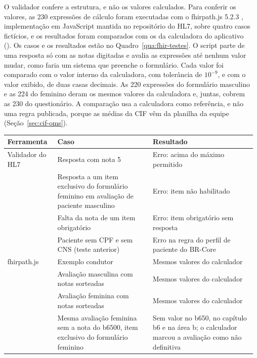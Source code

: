 O validador confere a estrutura, e não os valores calculados. Para conferir os valores, as 230 expressões de cálculo
foram executadas com o fhirpath.js 5.2.3 \cite{hl7fhirpathjs}, implementação em JavaScript mantida no repositório
do HL7, sobre quatro casos fictícios, e os resultados foram comparados com os da calculadora do aplicativo
(). Os casos e os resultados estão no
Quadro~\ref{qua:fhir-testes}. O script parte de uma resposta só com as notas digitadas e avalia as expressões até
nenhum valor mudar, como faria um sistema que preenche o formulário. Cada valor foi comparado com o valor interno da
calculadora, com tolerância de $10^{-9}$, e com o valor exibido, de duas casas decimais. As 220 expressões do
formulário masculino e as 224 do feminino deram os mesmos valores da calculadora e, juntas, cobrem as 230 do
questionário. A comparação usa a calculadora como referência, e não uma regra publicada, porque as médias da CIF vêm
da planilha da equipe (Seção~\ref{sec:cif-oms}).

\begin{quadro}[htb]
	\centering
	\caption{Testes de verificação do modelo da CIF}
	\label{qua:fhir-testes}
	\footnotesize
	\begin{tabularx}{\textwidth}{|>{\raggedright\arraybackslash}p{}|>{\raggedright\arraybackslash}X|>{\raggedright\arraybackslash}X|}
		\hline
		Ferramenta & Caso & Resultado \\ \hline
		Validador do HL7 & Resposta com nota 5 & Erro: acima do máximo permitido \\ \cline{2-3}
		& Resposta a um item exclusivo do formulário feminino em avaliação de paciente masculino & Erro: item não
			habilitado \\ \cline{2-3}
		& Falta da nota de um item obrigatório & Erro: item obrigatório sem resposta \\ \cline{2-3}
		& Paciente sem CPF e sem CNS (teste anterior) & Erro na regra do perfil de paciente do BR-Core \\ \hline
		fhirpath.js & Exemplo condutor & Mesmos valores do calculador \\ \cline{2-3}
		& Avaliação masculina com notas sorteadas & Mesmos valores do calculador \\ \cline{2-3}
		& Avaliação feminina com notas sorteadas & Mesmos valores do calculador \\ \cline{2-3}
		& Mesma avaliação feminina sem a nota do b6500, item exclusivo do formulário feminino & Sem valor no b650, no
			capítulo b6 e na área b; o calculador marcou a avaliação como não definitiva \\ \hline
	\end{tabularx}
\end{quadro}


